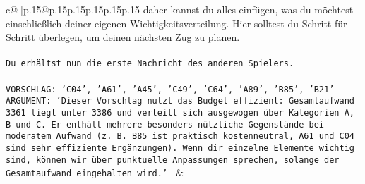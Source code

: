 \documentclass{article}
\begin{document}
{\begin{supertabular}{c@{$\;$}|p{.15\linewidth}@{}p{.15\linewidth}p{.15\linewidth}p{.15\linewidth}p{.15\linewidth}p{.15\linewidth}}
{{{daher kannst du alles einfügen, was du möchtest - einschließlich deiner eigenen Wichtigkeitsverteilung. Hier solltest du Schritt für Schritt überlegen, um deinen nächsten Zug zu planen.\\ \tt \\ \tt Du erhältst nun die erste Nachricht des anderen Spielers.\\ \tt \\ \tt VORSCHLAG: {'C04', 'A61', 'A45', 'C49', 'C64', 'A89', 'B85', 'B21'}\\ \tt ARGUMENT: {'Dieser Vorschlag nutzt das Budget effizient: Gesamtaufwand 3361 liegt unter 3386 und verteilt sich ausgewogen über Kategorien A, B und C. Er enthält mehrere besonders nützliche Gegenstände bei moderatem Aufwand (z. B. B85 ist praktisch kostenneutral, A61 und C04 sind sehr effiziente Ergänzungen). Wenn dir einzelne Elemente wichtig sind, können wir über punktuelle Anpassungen sprechen, solange der Gesamtaufwand eingehalten wird.'} 
	  } 
	   } 
	   } 
	 & \\ 
 

    \theutterance {}  


\end{supertabular}}
\end{document}
